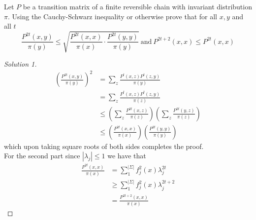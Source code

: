\documentclass[a4paper]{article}
\begin{document}
	\begin{question}[Question 13]
	Let $P$ be a transition matrix of a finite reversible chain with invariant distribution $\pi$. Using the Cauchy-Schwarz inequality or otherwise prove that for all $x,y$ and all $t$
	\[ \frac{P^{2t}(x, y)}{\pi (y)} \leq \sqrt{\frac{P^{2t}(x,x)}{\pi (x)} \cdot \frac{P^{2t}(y,y)}{\pi (y)}} \ \text{and} \ P^{2t+2}(x,x) \leq P^{2t} (x,x)\]
	\end{question}
	\begin{proof}[Solution 1]
	\begin{align*}
	\left( \frac{P^{2t}(x, y)}{\pi (y)} \right)^2 &= \sum_{z} \frac{P^t(x,z)P^t(z,y)}{\pi(y)}\\
	&= \sum_{z}\frac{P^t(x,z)P^t(z,y)}{\pi(z)}\\
	&\leq \left( \sum_{z} \frac{P^{2t}(x,z)}{\pi(z)} \right) \left( \sum_{z} \frac{P^{2t}(y,z)}{\pi(z)} \right)\\
	&\leq \left( \frac{P^{2t}(x,x)}{\pi(x)} \right) \left( \frac{P^{2t}(y,y)}{\pi(y)} \right)
	\end{align*}
	which upon taking square roots of both sides completes the proof.\\
	For the second part since $|\lambda_j| \leq 1$ we have that
	\begin{align*}
	\frac{P^{2t}(x,x)}{\pi (x)} &= \sum_{1}^{|\Sigma|} f_{j}^2 (x) \lambda_j^{2t}\\
	&\geq \sum_{1}^{|\Sigma|} f_{j}^2 (x) \lambda_j^{2t+2}\\
	&= \frac{P^{2t+2}(x,x)}{\pi (x)}
	\end{align*}
	\end{proof}
\end{document}
